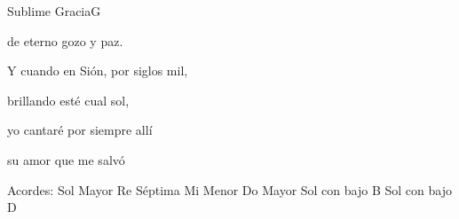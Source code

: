\documentclass[12pt, spanish]{book}
\begin{document}
\begin{song}{Sublime Gracia}{G}
\begin{SBOpGroup}
            de eterno gozo y paz.
        \end{SBOpGroup}
        \vskip 20pt
        \begin{SBOpGroup}
            Y cuando en Sión, por siglos mil,

            brillando esté cual sol,

            yo cantaré por siempre allí

            su amor que me salvó
        \end{SBOpGroup}

        \ifChordBk
        \begin{SBOpGroup}
            Acordes:\break
            \upchord{\G}\qquad Sol Mayor \hfill
            \upchord{\Dseven}\qquad Re S\'eptima \hfill\null\break
            \upchord{\Em}\qquad Mi Menor \hfill
            \upchord{\C}\qquad Do Mayor \hfill\null\break
            \upchord{\GB}\qquad Sol con bajo B \hfill
            \upchord{\GD}\qquad Sol con bajo D \hfill\null\break
        \end{SBOpGroup}
        \fi
    \end{song}
\end{document}
